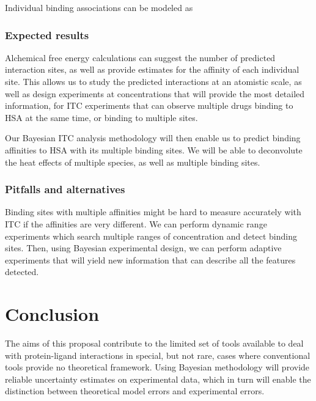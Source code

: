 \documentclass[10pt,final]{article}
\begin{document}

Individual binding associations can be modeled as

\subsubsection*{Expected results}
Alchemical free energy calculations can suggest the number of predicted interaction sites, as well as provide estimates for the affinity of each individual site.
This allows us to study the predicted interactions at an atomistic scale, as well as design experiments at concentrations that will provide the most detailed information, for ITC experiments that can observe multiple drugs binding to HSA at the same time, or binding to multiple sites.


Our Bayesian ITC analysis methodology will then enable us to predict binding affinities to HSA with its multiple binding sites. We will be able to deconvolute the heat effects of multiple species, as well as multiple binding sites.

\subsubsection*{Pitfalls and alternatives}
Binding sites with multiple affinities might be hard to measure accurately with ITC if the affinities are very different. We can perform dynamic range experiments which search multiple ranges of concentration and detect binding sites. Then, using Bayesian experimental design, we can perform adaptive experiments that will yield new information that can describe all the features detected.


\section*{Conclusion}
The aims of this proposal contribute to the limited set of tools available to deal with protein-ligand interactions in special, but not rare, cases where conventional tools provide no theoretical framework. Using Bayesian methodology will provide reliable uncertainty estimates on experimental data, which in turn will enable the distinction between theoretical model errors and experimental errors.

\printbibliography
\end{document}
